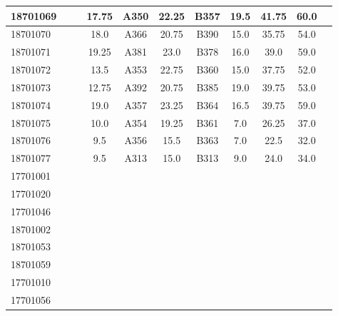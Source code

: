 \documentclass[12pt]{article}
\begin{document}
\begin{center}
\begin{small}
\begin{tabular}{|l|c|c|c|c|c|c|c|c|c|c|}
18701069 &  &  & 17.75 & A350 & 22.25 & B357 & 19.5 & 41.75 & 60.0\\ \hline 
18701070 &  &  & 18.0 & A366 & 20.75 & B390 & 15.0 & 35.75 & 54.0\\ \hline 
18701071 &  &  & 19.25 & A381 & 23.0 & B378 & 16.0 & 39.0 & 59.0\\ \hline 
18701072 &  &  & 13.5 & A353 & 22.75 & B360 & 15.0 & 37.75 & 52.0\\ \hline 
18701073 &  &  & 12.75 & A392 & 20.75 & B385 & 19.0 & 39.75 & 53.0\\ \hline 
18701074 &  &  & 19.0 & A357 & 23.25 & B364 & 16.5 & 39.75 & 59.0\\ \hline 
18701075 &  &  & 10.0 & A354 & 19.25 & B361 & 7.0 & 26.25 & 37.0\\ \hline 
18701076 &  &  & 9.5 & A356 & 15.5 & B363 & 7.0 & 22.5 & 32.0\\ \hline 
18701077 &  &  & 9.5 & A313 & 15.0 & B313 & 9.0 & 24.0 & 34.0\\ \hline 
17701001 &  &  &  &  &  &  &  &  & \\ \hline 
17701020 &  &  &  &  &  &  &  &  & \\ \hline 
17701046 &  &  &  &  &  &  &  &  & \\ \hline 
18701002 &  &  &  &  &  &  &  &  & \\ \hline 
18701053 &  &  &  &  &  &  &  &  & \\ \hline 
18701059 &  &  &  &  &  &  &  &  & \\ \hline 
17701010 &  &  &  &  &  &  &  &  & \\ \hline 
17701056 &  &  &  &  &  &  &  &  & \\ \hline 
        \end{tabular}
            \end{small}
            \end{center}
  \centering
            
\end{document}

